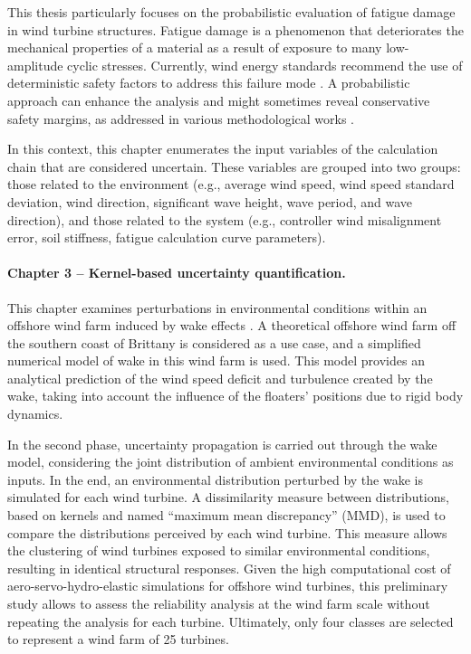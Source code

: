 This thesis particularly focuses on the probabilistic evaluation of fatigue damage in wind turbine structures. 
Fatigue damage is a phenomenon that deteriorates the mechanical properties of a material as a result of exposure to many low-amplitude cyclic stresses. 
Currently, wind energy standards recommend the use of deterministic safety factors to address this failure mode \citep{dnv_loads_2016,iec_2019}. 
A probabilistic approach can enhance the analysis and might sometimes reveal conservative safety margins, as addressed in various methodological works \citep{huchet_2019,lataniotis_2019,petrovska_2022}.

In this context, this chapter enumerates the input variables of the calculation chain that are considered uncertain. 
These variables are grouped into two groups: those related to the environment (e.g., average wind speed, wind speed standard deviation, wind direction, significant wave height, wave period, and wave direction), 
and those related to the system (e.g., controller wind misalignment error, soil stiffness, fatigue calculation curve parameters).


\paragraph{Chapter 3 -- Kernel-based uncertainty quantification.} 
This chapter examines perturbations in environmental conditions within an offshore wind farm induced by wake effects \citep{larsen_2008_wake}. 
A theoretical offshore wind farm off the southern coast of Brittany is considered as a use case, and a simplified numerical model of wake in this wind farm is used. 
This model provides an analytical prediction of the wind speed deficit and turbulence created by the wake, taking into account the influence of the floaters' positions due to rigid body dynamics. 

In the second phase, uncertainty propagation is carried out through the wake model, considering the joint distribution of ambient environmental conditions as inputs. 
In the end, an environmental distribution perturbed by the wake is simulated for each wind turbine. 
A dissimilarity measure between distributions, based on kernels and named ``maximum mean discrepancy'' (MMD), is used to compare the distributions perceived by each wind turbine. 
This measure allows the clustering of wind turbines exposed to similar environmental conditions, resulting in identical structural responses. 
Given the high computational cost of aero-servo-hydro-elastic simulations for offshore wind turbines, this preliminary study allows to assess the reliability analysis at the wind farm scale without repeating the analysis for each turbine. 
Ultimately, only four classes are selected to represent a wind farm of 25 turbines.


